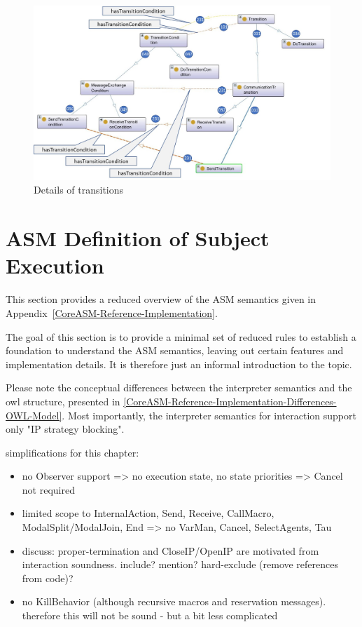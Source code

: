 \begin{figure}[htbp]
	\centering
	\includegraphics[width=1.0\linewidth]{Figures/Ontology/SubjectExecution/20190105-Transitions}
	\caption[Details of transitions]{Details of transitions}
	\label{fig:20190105-transitions}
\end{figure}

\section{ASM Definition of Subject Execution}



This section provides a reduced overview of the ASM semantics given in Appendix~\ref{CoreASM-Reference-Implementation}.

The goal of this section is to provide a minimal set of reduced rules to establish a foundation to understand the ASM semantics,
leaving out certain features and implementation details.
It is therefore just an informal introduction to the topic.

Please note the conceptual differences between the interpreter semantics and the owl structure, presented in \ref{CoreASM-Reference-Implementation-Differences-OWL-Model}.
Most importantly, the interpreter semantics for interaction support only "IP strategy blocking".

simplifications for this chapter:
\begin{itemize}
	\item no Observer support => no execution state, no state priorities => Cancel not required
	\item limited scope to InternalAction, Send, Receive, CallMacro, ModalSplit/ModalJoin, End => no VarMan, Cancel, SelectAgents, Tau
	\item discuss: proper-termination and CloseIP/OpenIP are motivated from interaction soundness. include? mention? hard-exclude (remove references from code)?
	\item no KillBehavior (although recursive macros and reservation messages). therefore this will not be sound - but a bit less complicated
\end{itemize}

